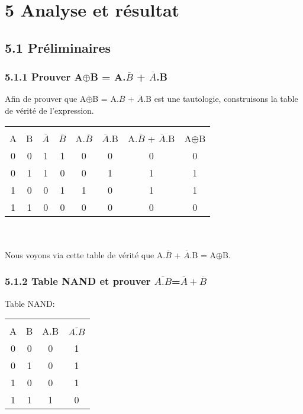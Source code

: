 \documentclass{report}
\begin{document}
\section*{5 Analyse et r\'esultat}
\subsection*{5.1 Pr\'eliminaires}
\subsubsection*{5.1.1 Prouver A$\oplus$B = A.$\overline{B}$ + $\overline{A}$.B}
\hspace*{1,5cm} Afin de prouver que A$\oplus$B = A.$\overline{B}$ + $\overline{A}$.B est une tautologie, construisons la table de v\'erit\'e de l'expression.\\
\begin{tabular}{|c|c|c|c|c|c|c|c|}
\hline
 & & & & & & & \\ 
A & B & $\overline{A}$ & $\overline{B}$ & A.$\overline{B}$ & $\overline{A}$.B & A.$\overline{B}$ + $\overline{A}$.B & A$\oplus$B \\
\hline
0&0&1&1&0&0&0&0\\
0&1&1&0&0&1&1&1\\
1&0&0&1&1&0&1&1\\
1&1&0&0&0&0&0&0\\
\hline
\end{tabular}\\
\\
\hspace*{1,5cm} Nous voyons via cette table de v\'erit\'e que A.$\overline{B}$ + $\overline{A}$.B = A$\oplus$B.\\
\subsubsection*{5.1.2 Table NAND et prouver $\overline{A.B}$=$\overline{A}+\overline{B}$}
Table NAND: \\
\begin{tabular}{|c|c|c|c|}
\hline
  & & & \\
 A & B & A.B & $\overline{A.B}$\\
\hline
 0 & 0 & 0 & 1\\
 0 & 1 & 0 & 1\\
 1 & 0 & 0 & 1\\
 1 & 1 & 1 & 0 \\
 \hline
\end{tabular} \\
\end{document}
